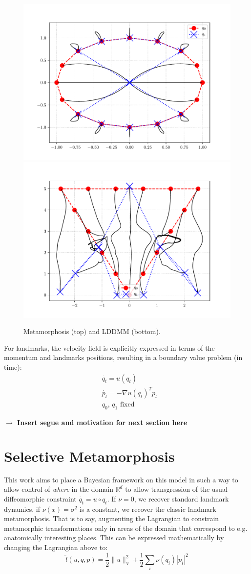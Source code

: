 \documentclass[runningheads]{llncs}
\newcommand{\half}{\frac 12}
\newcommand{\norm}[2]{\| #1 \|_{ #2 }}
\newcommand{\vnorm}[1]{\norm{ #1 }{V}}
\newcommand{\Rd}{\mathbb{R}^{d}}
\begin{document}
\begin{figure}
\begin{minipage}{\textwidth}
    \includegraphics[width=.3\textwidth]{lddmm/lddmm_squeeze.pdf}\quad
    \includegraphics[width=.3\textwidth]{lddmm/lddmm_triangle_flip.pdf}
    \caption{Metamorphosis (top) and LDDMM (bottom).}
    \label{fig:mm_lddmm}
\end{minipage}
\end{figure}

For landmarks, the velocity field is explicitly expressed in terms of the
momentum and landmarks positions, resulting in a boundary value problem (in
time):
\begin{align}
& \dot{q_t} = u(q_t)\\
& \dot{p_t} = - \nabla u(q_t)^T p_t\\
& q_0,\,q_1\text{ fixed}
\end{align}

\textbf{$\longrightarrow$ Insert segue and motivation for next section here}

\section{Selective Metamorphosis}\label{sec:select_mm}

This work aims to place a Bayesian framework on this model in such a way to
allow control of \emph{where} in the domain $\Rd$ to allow transgression of the
usual diffeomorphic constraint $\dot{q_t} = u\circ q_t$. If $\nu=0$, we recover
standard landmark dynamics, if $\nu(x)=\sigma^2$ is a constant, we recover the
classic landmark metamorphosis. That is to say, augmenting the Lagrangian to
constrain metamorphic transformations only in areas of the domain that
correspond to e.g. anatomically interesting places.  This can be expressed
mathematically by changing the Lagrangian above to:
\[
\hat l(u, q, p) = \half\vnorm{u}^2 + \half\sum_i \nu(q_i)|p_i|^2
\]
\end{document}
